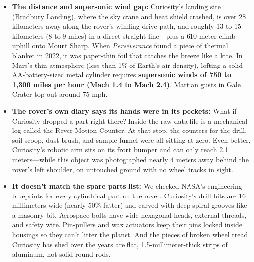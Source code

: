 \documentclass[11pt,a4paper]{article}
\begin{document}
\begin{itemize}
	\item \textbf{The distance and supersonic wind gap:} Curiosity's landing site (Bradbury Landing), where the sky crane and heat shield crashed, is over 28 kilometers away along the rover's winding drive path, and roughly 13 to 15 kilometers (8 to 9 miles) in a direct straight line---plus a 610-meter climb uphill onto Mount Sharp. When \textit{Perseverance} found a piece of thermal blanket in 2022, it was paper-thin foil that catches the breeze like a kite. In Mars's thin atmosphere (less than 1\% of Earth's air density), lofting a solid AA-battery-sized metal cylinder requires \textbf{supersonic winds of 750 to 1,300 miles per hour (Mach 1.4 to Mach 2.4)}. Martian gusts in Gale Crater top out around 75 mph.
	\item \textbf{The rover's own diary says its hands were in its pockets:} What if Curiosity dropped a part right there? Inside the raw data file is a mechanical log called the Rover Motion Counter. At that stop, the counters for the drill, soil scoop, dust brush, and sample funnel were all sitting at zero. Even better, Curiosity's robotic arm sits on its front bumper and can only reach 2.1 meters---while this object was photographed nearly 4 meters away behind the rover's left shoulder, on untouched ground with no wheel tracks in sight.
	\item \textbf{It doesn't match the spare parts list:} We checked NASA's engineering blueprints for every cylindrical part on the rover. Curiosity's drill bits are 16 millimeters wide (nearly 50\% fatter) and carved with deep spiral grooves like a masonry bit. Aerospace bolts have wide hexagonal heads, external threads, and safety wire. Pin-pullers and wax actuators keep their pins locked inside housings so they can't litter the planet. And the pieces of broken wheel tread Curiosity has shed over the years are flat, 1.5-millimeter-thick strips of aluminum, not solid round rods.

\end{itemize}
\end{document}

